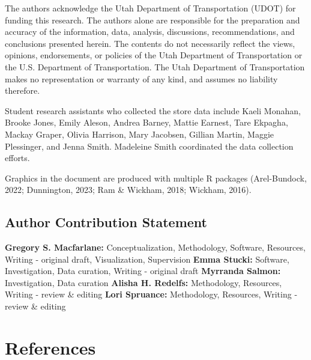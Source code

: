 \documentclass[
  letterpaper,
  number,
  review,
  3p]{elsarticle}
\begin{document}
The authors acknowledge the Utah Department of Transportation (UDOT) for
funding this research. The authors alone are responsible for the
preparation and accuracy of the information, data, analysis,
discussions, recommendations, and conclusions presented herein. The
contents do not necessarily reflect the views, opinions, endorsements,
or policies of the Utah Department of Transportation or the U.S.
Department of Transportation. The Utah Department of Transportation
makes no representation or warranty of any kind, and assumes no
liability therefore.

Student research assistants who collected the store data include Kaeli
Monahan, Brooke Jones, Emily Aleson, Andrea Barney, Mattie Earnest, Tare
Ekpagha, Mackay Graper, Olivia Harrison, Mary Jacobsen, Gillian Martin,
Maggie Plessinger, and Jenna Smith. Madeleine Smith coordinated the data
collection efforts.

Graphics in the document are produced with multiple R packages
(Arel-Bundock, 2022; Dunnington, 2023; Ram \& Wickham, 2018; Wickham,
2016).

\subsection*{Author Contribution
Statement}\label{author-contribution-statement}


\textbf{Gregory S. Macfarlane:} Conceptualization, Methodology,
Software, Resources, Writing - original draft, Visualization,
Supervision \textbf{Emma Stucki:} Software, Investigation, Data
curation, Writing - original draft \textbf{Myrranda Salmon:}
Investigation, Data curation \textbf{Alisha H. Redelfs:} Methodology,
Resources, Writing - review \& editing \textbf{Lori Spruance:}
Methodology, Resources, Writing - review \& editing


\section*{References}\label{references}

\end{document}
